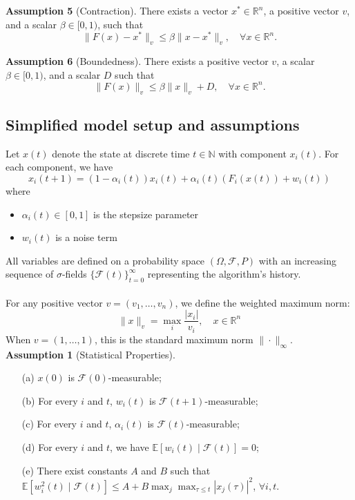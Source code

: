 \vspace{1em}

\noindent
\textbf{Assumption 5} (Contraction).
There exists a vector $x^* \in \mathbb{R}^n$, a positive vector $v$, and a scalar $\beta \in [0,1)$, such that
\begin{equation}
\|F(x) - x^*\|_v \leq \beta \|x - x^*\|_v, \quad \forall x \in \mathbb{R}^n.
\end{equation}

\vspace{1em}

\noindent
\textbf{Assumption 6} (Boundedness).
There exists a positive vector $v$, a scalar $\beta \in [0,1)$, and a scalar $D$ such that
\begin{equation}
\|F(x)\|_v \leq \beta\|x\|_v + D, \quad \forall x \in \mathbb{R}^n.
\end{equation}
\subsection{Simplified model setup and assumptions}
Let $x(t)$ denote the state at discrete time $t\in\mathbb{N}$ with component $x_i(t)$. For each component, we have
$$
x_i(t+1) = (1-\alpha_i(t))x_i(t) + \alpha_i(t)(F_i(x(t)) + w_i(t)) 
$$
where
\begin{itemize}
    \item $\alpha_i(t) \in [0,1]$ is the stepsize parameter
    \item $w_i(t)$ is a noise term
\end{itemize}
All variables are defined on a probability space $(\Omega, \mathcal{F}, P)$ with an increasing sequence of $\sigma$-fields $\{\mathcal{F}(t)\}_{t=0}^{\infty}$ representing the algorithm's history. \\
\\
For any positive vector $v = (v_1, \ldots, v_n)$, we define the weighted maximum norm:
\begin{equation*}
\|x\|_v = \max_i \frac{|x_i|}{v_i}, \quad x \in \mathbb{R}^n
\end{equation*}
\noindent When $v = (1,\ldots,1)$, this is the standard maximum norm $\|\cdot\|_{\infty}$.\\
\noindent
\textbf{Assumption 1} (Statistical Properties).
\begin{enumerate}
\item[(a)] $x(0)$ is $\mathcal{F}(0)$-measurable;
\item[(b)] For every $i$ and $t$, $w_i(t)$ is $\mathcal{F}(t+1)$-measurable;
\item[(c)] For every $i$ and $t$, $\alpha_i(t)$ is $\mathcal{F}(t)$-measurable;
\item[(d)] For every $i$ and $t$, we have $\mathbb{E}[w_i(t) \mid \mathcal{F}(t)] = 0$;
\item[(e)] There exist constants $A$ and $B$ such that
$\mathbb{E}[w_i^2(t) \mid \mathcal{F}(t)] \leq A + B \max_j \max_{\tau \leq t} |x_j(\tau)|^2$, $\forall i, t$.
\end{enumerate}

